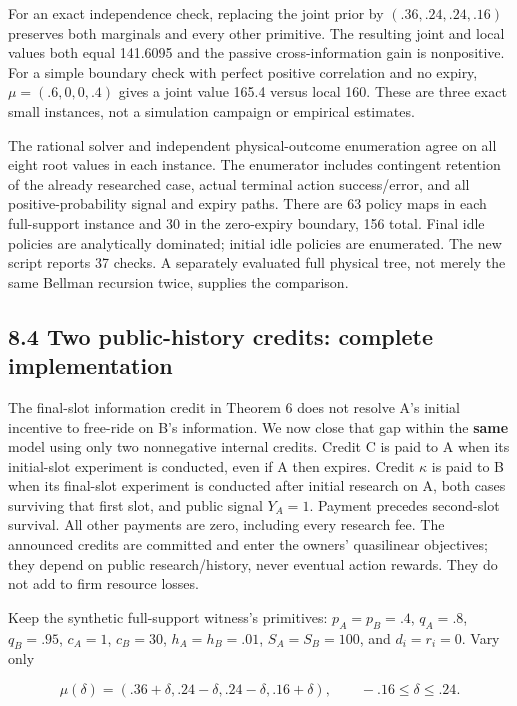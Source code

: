 \documentclass[
  11pt,
]{article}
\begin{document}
For an exact independence check, replacing the joint prior by
\((.36,.24,.24,.16)\) preserves both marginals and every other
primitive. The resulting joint and local values both equal 141.6095 and
the passive cross-information gain is nonpositive. For a simple boundary
check with perfect positive correlation and no expiry,
\(\mu=(.6,0,0,.4)\) gives a joint value 165.4 versus local 160. These
are three exact small instances, not a simulation campaign or empirical
estimates.

The rational solver and independent physical-outcome enumeration agree
on all eight root values in each instance. The enumerator includes
contingent retention of the already researched case, actual terminal
action success/error, and all positive-probability signal and expiry
paths. There are 63 policy maps in each full-support instance and 30 in
the zero-expiry boundary, 156 total. Final idle policies are
analytically dominated; initial idle policies are enumerated. The new
script reports 37 checks. A separately evaluated full physical tree, not
merely the same Bellman recursion twice, supplies the comparison.

\subsection{8.4 Two public-history credits: complete
implementation}\label{two-public-history-credits-complete-implementation}

The final-slot information credit in Theorem 6 does not resolve A's
initial incentive to free-ride on B's information. We now close that gap
within the \textbf{same} model using only two nonnegative internal
credits. Credit C is paid to A when its initial-slot experiment is
conducted, even if A then expires. Credit \(\kappa\) is paid to B when
its final-slot experiment is conducted after initial research on A, both
cases surviving that first slot, and public signal \(Y_A=1\). Payment
precedes second-slot survival. All other payments are zero, including
every research fee. The announced credits are committed and enter the
owners' quasilinear objectives; they depend on public research/history,
never eventual action rewards. They do not add to firm resource losses.

Keep the synthetic full-support witness's primitives: \(p_A=p_B=.4\),
\(q_A=.8\), \(q_B=.95\), \(c_A=1\), \(c_B=30\), \(h_A=h_B=.01\),
\(S_A=S_B=100\), and \(d_i=r_i=0\). Vary only

\[\mu(\delta)=(.36+\delta,.24-\delta,.24-\delta,.16+\delta),
\qquad -.16\leq\delta\leq .24.\]
\end{document}
